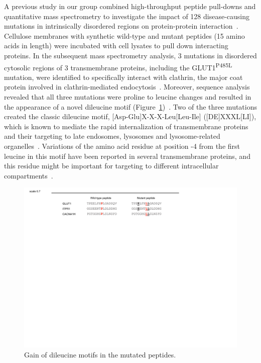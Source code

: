 A previous study in our group combined high-throughput peptide pull-downs and quantitative mass spectrometry to investigate the impact of 128 disease-causing mutations in intrinsically disordered regions on protein-protein interaction~\cite{Meyer2}. Cellulose membranes with synthetic wild-type and mutant peptides (15 amino acids in length) were incubated with cell lysates to pull down interacting proteins. In the subsequent mass spectrometry analysis, 3 mutations in disordered cytosolic regions of 3 transmembrane proteins, including the GLUT1\textsuperscript{P485L} mutation, were identified to specifically interact with clathrin, the major coat protein involved in clathrin-mediated endocytosis~\cite{Meyer2}. Moreover, sequence analysis revealed that all three mutations were proline to leucine changes and resulted in the appearance of a novel dileucine motif (Figure~\ref{fig:motif})~\cite{Meyer2}. Two of the three mutations created the classic dileucine motif, [Asp-Glu]X-X-X-Leu[Leu-Ile] ([DE]XXXL[LI]), which is known to mediate the rapid internalization of transmembrane proteins and their targeting to late endosomes, lysosomes and lysosome-related organelles~\cite{Bonifacino}. Variations of the amino acid residue at position -4 from the first leucine in this motif have been reported in several transmembrane proteins, and this residue might be important for targeting to different intracellular compartments~\cite{Bonifacino,Sandoval}.
\begin{figure}[h]
\centering
\includegraphics[scale=0.7]{Figures/motif}
\caption{Gain of dileucine motifs in the mutated peptides.}
\label{fig:motif}
\end{figure}

